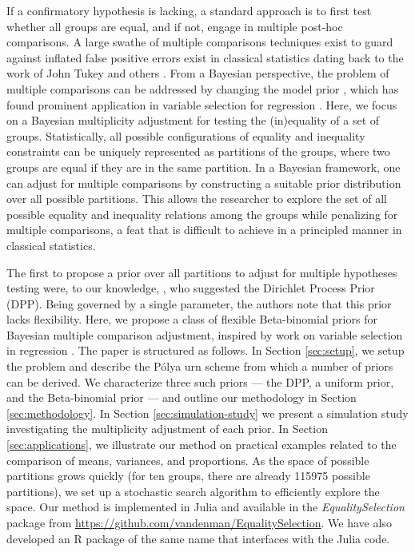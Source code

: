 \documentclass[11pt,a4paper]{article}
\theoremstyle{definition} %
\theoremstyle{case}
\begin{document}
If a confirmatory hypothesis is lacking, a standard approach is to first test whether all groups are equal, and if not, engage in multiple post-hoc comparisons. A large swathe of multiple comparisons techniques exist to guard against inflated false positive errors exist in classical statistics dating back to the work of John Tukey and others \parencite[][]{rao2009multiple, benjamini2002john}. From a Bayesian perspective, the problem of multiple comparisons can be addressed by changing the model prior \parencite[e.g.,][]{jeffreys1961theory, westfall1997bayesian, berry1999bayesian}, which has found prominent application in variable selection for regression \parencite[e.g.,][]{scott2006exploration, scott2010bayes}. Here, we focus on a Bayesian multiplicity adjustment for testing the (in)equality of a set of groups. Statistically, all possible configurations of equality and inequality constraints can be uniquely represented as partitions of the groups, where two groups are equal if they are in the same partition. In a Bayesian framework, one can adjust for multiple comparisons by constructing a suitable prior distribution over all possible partitions. This allows the researcher to explore the set of all possible equality and inequality relations among the groups while penalizing for multiple comparisons, a feat that is difficult to achieve in a principled manner in classical statistics.

The first to propose a prior over all partitions to adjust for multiple hypotheses testing were, to our knowledge, \textcite{gopalan1998bayesian}, who suggested the Dirichlet Process Prior (DPP). Being governed by a single parameter, the authors note that this prior lacks flexibility. Here, we propose a class of flexible Beta-binomial priors for Bayesian multiple comparison adjustment, inspired by work on variable selection in regression \parencite{scott2006exploration, scott2010bayes}. The paper is structured as follows. In Section \ref{sec:setup}, we setup the problem and describe the P\'{o}lya urn scheme from which a number of priors can be derived. We characterize three such priors --- the DPP, a uniform prior, and the Beta-binomial prior --- and outline our methodology in Section \ref{sec:methodology}. In Section \ref{sec:simulation-study} we present a simulation study investigating the multiplicity adjustment of each prior. In Section \ref{sec:applications}, we illustrate our method on practical examples related to the comparison of means, variances, and proportions. As the space of possible partitions grows quickly (for ten groups, there are already 115975 possible partitions), we set up a stochastic search algorithm to efficiently explore the space. Our method is implemented in Julia and available in the \textit{EqualitySelection} package from \url{https://github.com/vandenman/EqualitySelection}. We have also developed an R package of the same name that interfaces with the Julia code.
\end{document}
